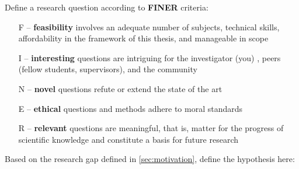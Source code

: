 Define a research question according to \textbf{FINER} criteria:

\begin{itemize}
	\item[F] -- \textbf{feasibility} involves an adequate number of subjects, technical skills, affordability in the framework of this thesis, and manageable in scope
	\item [I] -- \textbf{interesting} questions are intriguing for the investigator (you) , peers (fellow students, supervisors), and the community
	\item[N] -- \textbf{novel} questions refute or extend the state of the art
	\item[E] -- \textbf{ethical} questions and methods adhere to moral standards
	\item[R] -- \textbf{relevant} questions are meaningful, that is, matter for the progress of scientific knowledge and constitute a basis for future research
\end{itemize}

Based on the research gap defined in \autoref{sec:motivation}, define the hypothesis here:

